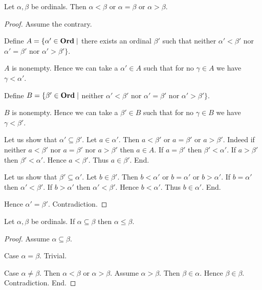\documentclass[10pt]{article}
\begin{document}
  \begin{forthel}
    \begin{proposition}
      Let $\alpha, \beta$ be ordinals.
      Then $\alpha < \beta$ or $\alpha = \beta$ or $\alpha > \beta$.
    \end{proposition}
    \begin{proof}
      Assume the contrary.
      
      Define $A = \{ \alpha' \in \textbf{Ord} \mid$ there exists an ordinal $\beta'$ such that neither $\alpha' < \beta'$ nor $\alpha' = \beta'$ nor $\alpha' > \beta' \}$.
      
      $A$ is nonempty.
      Hence we can take a $\alpha' \in A$ such that for no $\gamma \in A$ we have $\gamma < \alpha'$.
      
      Define $B = \{ \beta' \in \textbf{Ord} \mid$ neither $\alpha' < \beta'$ nor $\alpha' = \beta'$ nor $\alpha' > \beta' \}$.
      
      $B$ is nonempty.
      Hence we can take a $\beta' \in B$ such that for no $\gamma \in B$ we have $\gamma < \beta'$.

      Let us show that $\alpha' \subseteq \beta'$.
        Let $a \in \alpha'$.
        Then $a < \beta'$ or $a = \beta'$ or $a > \beta'$.
        Indeed if neither $a < \beta'$ nor $a = \beta'$ nor $a > \beta'$ then
        $a \in A$.
        If $a = \beta'$ then $\beta' < \alpha'$.
        If $a > \beta'$ then $\beta' < \alpha'$.
        Hence $a < \beta'$.
        Thus $a \in \beta'$.
      End.

      Let us show that $\beta' \subseteq \alpha'$.
        Let $b \in \beta'$.
        Then $b < \alpha'$ or $b = \alpha'$ or $b > \alpha'$.
        If $b = \alpha'$ then $\alpha' < \beta'$.
        If $b > \alpha'$ then $\alpha' < \beta'$.
        Hence $b < \alpha'$.
        Thus $b \in \alpha'$.
      End.

      Hence $\alpha' = \beta'$.
      Contradiction.
    \end{proof}
  \end{forthel}

  \begin{forthel}
    \begin{proposition}
      Let $\alpha, \beta$ be ordinals.
      If $\alpha \subseteq \beta$ then $\alpha \leq \beta$.
    \end{proposition}
    \begin{proof}
      Assume $\alpha \subseteq \beta$.

      Case $\alpha = \beta$. Trivial.

      Case $\alpha \neq \beta$.
        Then $\alpha < \beta$ or $\alpha > \beta$.
        Assume $\alpha > \beta$.
        Then $\beta \in \alpha$.
        Hence $\beta \in \beta$.
        Contradiction.
      End.
    \end{proof}
  \end{forthel}
\end{document}
